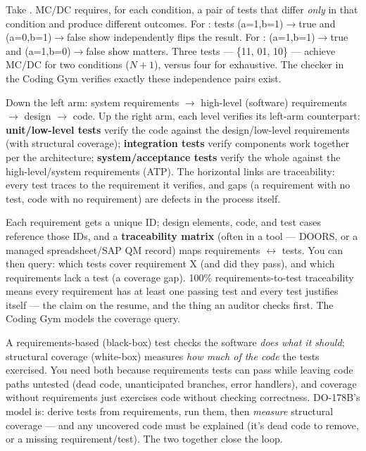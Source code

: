 Take . MC/DC requires, for each condition, a pair of tests
that differ \emph{only} in that condition and produce different outcomes. For
: tests (a=1,b=1)$\rightarrow$true and (a=0,b=1)$\rightarrow$false show
 independently flips the result. For : (a=1,b=1)$\rightarrow$true
and (a=1,b=0)$\rightarrow$false show  matters. Three tests --- \{11, 01,
10\} --- achieve MC/DC for two conditions ($N+1$), versus four for exhaustive.
The checker in the Coding Gym verifies exactly these independence pairs exist.

Down the left arm: system requirements $\rightarrow$ high-level (software)
requirements $\rightarrow$ design $\rightarrow$ code. Up the right arm, each
level verifies its left-arm counterpart: \textbf{unit/low-level tests} verify the
code against the design/low-level requirements (with structural coverage);
\textbf{integration tests} verify components work together per the architecture;
\textbf{system/acceptance tests} verify the whole against the high-level/system
requirements (ATP). The horizontal links are traceability: every test traces to
the requirement it verifies, and gaps (a requirement with no test, code with no
requirement) are defects in the process itself.

Each requirement gets a unique ID; design elements, code, and test cases
reference those IDs, and a \textbf{traceability matrix} (often in a tool ---
DOORS, or a managed spreadsheet/SAP QM record) maps requirements
$\leftrightarrow$ tests. You can then query: which tests cover requirement X (and
did they pass), and which requirements lack a test (a coverage gap). 100\%
requirements-to-test traceability means every requirement has at least one
passing test and every test justifies itself --- the claim on the resume, and the
thing an auditor checks first. The Coding Gym models the coverage query.

A requirements-based (black-box) test checks the software \emph{does what it
should}; structural coverage (white-box) measures \emph{how much of the code} the
tests exercised. You need both because requirements tests can pass while leaving
code paths untested (dead code, unanticipated branches, error handlers), and
coverage without requirements just exercises code without checking correctness.
DO-178B's model is: derive tests from requirements, run them, then \emph{measure}
structural coverage --- and any uncovered code must be explained (it's dead code
to remove, or a missing requirement/test). The two together close the loop.

